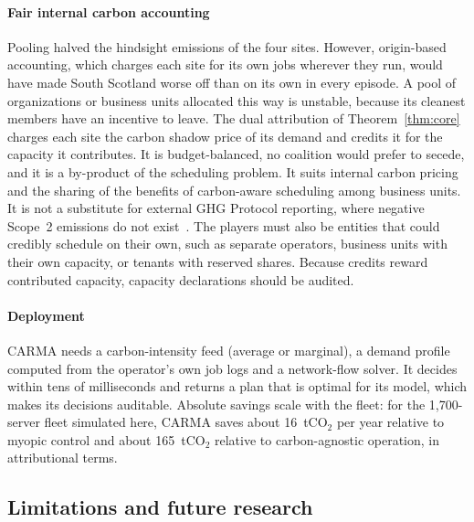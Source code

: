 \paragraph{Fair internal carbon accounting} Pooling halved the hindsight emissions of the four sites. However, origin-based accounting, which charges each site for its own jobs wherever they run, would have made South Scotland worse off than on its own in every episode. A pool of organizations or business units allocated this way is unstable, because its cleanest members have an incentive to leave. The dual attribution of Theorem~\ref{thm:core} charges each site the carbon shadow price of its demand and credits it for the capacity it contributes. It is budget-balanced, no coalition would prefer to secede, and it is a by-product of the scheduling problem. It suits internal carbon pricing and the sharing of the benefits of carbon-aware scheduling among business units. It is not a substitute for external GHG Protocol reporting, where negative Scope~2 emissions do not exist~\cite{ghg2015scope2}. The players must also be entities that could credibly schedule on their own, such as separate operators, business units with their own capacity, or tenants with reserved shares. Because credits reward contributed capacity, capacity declarations should be audited.

\paragraph{Deployment} CARMA needs a carbon-intensity feed (average or marginal), a demand profile computed from the operator's own job logs and a network-flow solver. It decides within tens of milliseconds and returns a plan that is optimal for its model, which makes its decisions auditable. Absolute savings scale with the fleet: for the 1{,}700-server fleet simulated here, CARMA saves about 16~tCO$_2$ per year relative to myopic control and about 165~tCO$_2$ relative to carbon-agnostic operation, in attributional terms.

\subsection{Limitations and future research}

